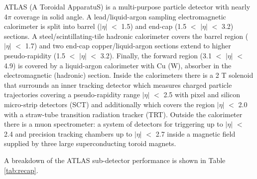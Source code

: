\documentclass[UKenglish,texlive=2013]{\ATLASLATEXPATH atlasdoc}
\begin{document}
ATLAS (A Toroidal ApparatuS) is a multi-purpose particle detector with nearly 4$\pi$ coverage in solid angle. A lead/liquid-argon
sampling electromagnetic calorimeter is split into barrel ($|\eta|$ $<$ 1.5) and end-cap (1.5 $<$ $|\eta|$ $<$ 3.2) sections.
A steel/scintillating-tile hadronic calorimeter covers the barrel region ($|\eta|$ $<$ 1.7) and two end-cap
copper/liquid-argon sections extend to higher pseudo-rapidity (1.5 $<$ $|\eta|$ $<$ 3.2). Finally, the forward
region (3.1 $<$ $|\eta|$ $<$ 4.9) is covered by a liquid-argon calorimeter with Cu (W), absorber in the electromagnetic (hadronic) section.
Inside the calorimeters there is a 2 T solenoid that surrounds an inner tracking detector which measures charged particle trajectories covering a pseudo-rapidity range $|\eta|$ $<$ 2.5 with pixel and silicon micro-strip detectors
(SCT) and additionally which covers the region $|\eta|$ $<$ 2.0 with a straw-tube transition radiation tracker (TRT).
Outside the calorimeter there is a muon spectrometer: a system of detectors for triggering up to $|\eta|$ $<$ 2.4 and
precision tracking chambers up to $|\eta|$ $<$ 2.7 inside a magnetic field supplied by three large superconducting toroid magnets.

A breakdown of the ATLAS sub-detector performance is shown in Table \ref{tab:recap}.
\end{document}
